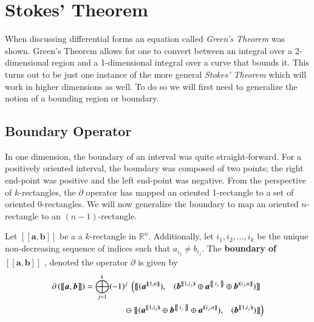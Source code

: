 %
%
\chapter{Stokes' Theorem}

When discussing differential forms an equation called \emph{Green's Theorem} was shown. 
Green's Theorem allows for one to convert between an integral over a 2-dimensional region and a 1-dimensional integral
over a curve that bounds it.
This turns out to be just one instance of the more general \emph{Stokes' Theorem} 
which will work in higher dimensions as well.
To do so we will first need to generalize the notion of a bounding region or boundary.




\section{Boundary Operator}


In one dimension, the boundary of an interval was quite straight-forward.
For a positively oriented interval, the boundary was composed of two points; 
the right end-point was positive and the left end-point was negative.
From the perspective of $k$-rectangles, 
the $\partial$ operator has mapped an oriented 1-rectangle to a set of oriented 0-rectangles.
We will now generalize the boundary to map an oriented $n$-rectangle to an $(n-1)$-rectangle.


\begin{definition}
	Let  $[\![\boldsymbol{a}, \boldsymbol{b}]\!]$ be a a $k$-rectangle in $\mathbb{R}^n$.
	Additionally, let $i_1, i_2, \ldots, i_k$ be the unique non-decreasing sequence of indices such that $a_{i_j} \neq b_{i_j}$.
	The \textbf{boundary of $ \boldsymbol{[\![ a,b ]\!]} $ }, denoted the operator $\partial$ is given by
	\begin{align}
		\label{eqn:defboundary}
		\partial \left( [\![ \boldsymbol{a}, \boldsymbol{b} ]\!] \right) 
		= \bigoplus_{j=1}^k (-1)^j \;
			\left(	
				[\![ 	(\boldsymbol{a}^{[\![1,n]\!]}), 
					\;\;\;
					(\boldsymbol{b}^{[\![1,i_j)\!)} 
						\oplus \boldsymbol{a}^{\hset{i_j}}
						\oplus \boldsymbol{b}^{(\!(i_j,n]\!]}) 
				]\!] \right.\;
			\notag\\
			\ominus \left.
				[\![ 	(\boldsymbol{a}^{[\![1,i_j)\!)}
						\oplus \boldsymbol{b}^{\hset{i_j}}
						\oplus \boldsymbol{a}^{(\!(i_j, n]\!]}), 
					\;\;\;		 
					(\boldsymbol{b}^{[\![1,i_j)\!)}) 			
				]\!]
			\right)
	\end{align}
\end{definition}


